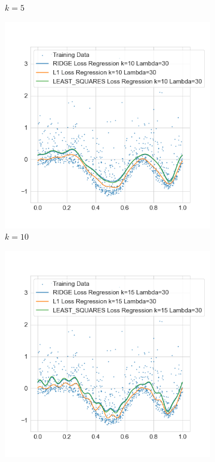 \documentclass{./tufte-handout}
\begin{document}
\begin{enumerate}[(a)]
\begin{enumerate}
\begin{figure}[!ht]
\begin{subfigure}[b]{.5\textwidth}
          \caption{$k=5$}
        \end{subfigure}
        \begin{subfigure}[b]{.5\textwidth}
          \centering
          \includegraphics[width=1.2\linewidth]{../figures/l1_vs_ridge_regression_vs_least_squares_k_10_lambda_30.png}
          \caption{$k=10$}
        \end{subfigure}%
        \hfill
        \begin{subfigure}[b]{.5\textwidth}
          \centering
          \includegraphics[width=1.2\linewidth]{../figures/l1_vs_ridge_regression_vs_least_squares_k_15_lambda_30.png}

\end{subfigure}
\end{figure}
\end{enumerate}
\end{enumerate}
\end{document}
